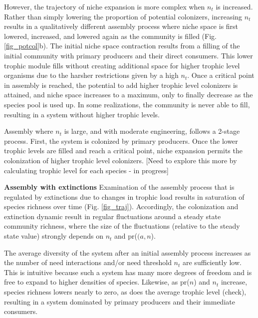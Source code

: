 \documentclass[twocolumn,preprintnumbers,amsmath,amssymb,superscriptaddress]{revtex4}
\begin{document}
However, the trajectory of niche expansion is more complex when $n_t$ is increased.
Rather than simply lowering the proportion of potential colonizers, increasing $n_t$ results in a qualitatively different assembly process where niche space is first lowered, increased, and lowered again as the community is filled (Fig. \ref{fig_potcol}b).
The initial niche space contraction results from a filling of the initial community with primary producers and their direct consumers.
This lower trophic module fills without creating additional space for higher trophic level organisms due to the harsher restrictions given by a high $n_t$.
Once a critical point in assembly is reached, the potential to add higher trophic level colonizers is attained, and niche space increases to a maximum, only to finally decrease as the species pool is used up.
In some realizations, the community is never able to fill, resulting in a system without higher trophic levels.

Assembly where $n_t$ is large, and with moderate engineering, follows a 2-stage process.
First, the system is colonized by primary producers.
Once the lower trophic levels are filled and reach a critical point, niche expansion permits the colonization of higher trophic level colonizers.
[Need to explore this more by calculating trophic level for each species - in progress]











{\bf Assembly with extinctions}
Examination of the assembly process that is regulated by extinctions due to changes in trophic load results in saturation of species richness over time (Fig. \ref{fig_traj}).
Accordingly, the colonization and extinction dynamic result in regular fluctuations around a steady state community richness, where the size of the fluctuations (relative to the steady state value) strongly depends on $n_t$ and pr($(a,n$).

The average diversity of the system after an initial assembly process increases as the number of need interactions and/or need threshold $n_t$ are sufficiently low.
This is intuitive because such a system has many more degrees of freedom and is free to expand to higher densities of species.
Likewise, as pr($n$) and $n_t$ increase, species richness lowers nearly to zero, as does the average trophic level (check), resulting in a system dominated by primary producers and their immediate consumers.
\end{document}
